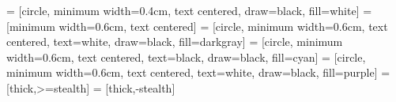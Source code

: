 

%
%
%
%
%
%
%





\usepackage{lipsum}

\usepackage{pdfpages}

\usetikzlibrary{positioning}
 = [circle, minimum width=0.4cm, text centered, draw=black, fill=white]
 = [minimum width=0.6cm, text centered]
 = [circle, minimum width=0.6cm, text centered, text=white, draw=black, fill=darkgray]
 = [circle, minimum width=0.6cm, text centered, text=black, draw=black, fill=cyan]
 = [circle, minimum width=0.6cm, text centered, text=white, draw=black, fill=purple]
 = [thick,>=stealth]
 = [thick,-stealth]

